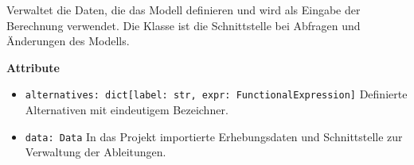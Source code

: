 \documentclass{article}
\begin{document}
Verwaltet die Daten, die das Modell definieren und wird als Eingabe der Berechnung verwendet. Die Klasse ist die Schnittstelle bei Abfragen und Änderungen des Modells.
\newline \newline

\textbf{{Attribute}}
\begin{itemize}
\item \texttt{alternatives: dict[label: str, expr: FunctionalExpression]} \newline
Definierte Alternativen mit eindeutigem Bezeichner.
\item \texttt{data: Data} \newline In das Projekt importierte Erhebungsdaten und Schnittstelle zur Verwaltung der Ableitungen.
\\\\
\end{itemize}
\end{document}
